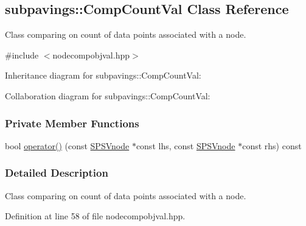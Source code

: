 \hypertarget{classsubpavings_1_1CompCountVal}{\subsection{subpavings\-:\-:\-Comp\-Count\-Val \-Class \-Reference}
\label{classsubpavings_1_1CompCountVal}
}


\-Class comparing on count of data points associated with a node.  




{\ttfamily \#include $<$nodecompobjval.\-hpp$>$}



\-Inheritance diagram for subpavings\-:\-:\-Comp\-Count\-Val\-:


\-Collaboration diagram for subpavings\-:\-:\-Comp\-Count\-Val\-:
\subsubsection*{\-Private \-Member \-Functions}
\begin{DoxyCompactItemize}
\item 
bool \hyperlink{classsubpavings_1_1CompCountVal_ad882397ab84d72fd5ab643ca499bc3b3}{operator()} (const \hyperlink{classsubpavings_1_1SPSVnode}{\-S\-P\-S\-Vnode} $\ast$const lhs, const \hyperlink{classsubpavings_1_1SPSVnode}{\-S\-P\-S\-Vnode} $\ast$const rhs) const 
\end{DoxyCompactItemize}


\subsubsection{\-Detailed \-Description}
\-Class comparing on count of data points associated with a node. 

\-Definition at line 58 of file nodecompobjval.\-hpp.



